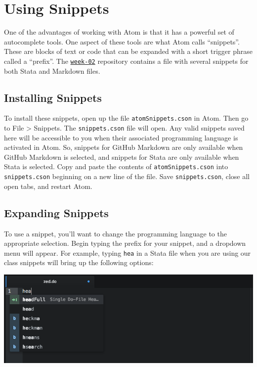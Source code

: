 \documentclass[]{book}
\begin{document}
\section{Using Snippets}\label{using-snippets}

One of the advantages of working with Atom is that it has a powerful set
of autocomplete tools. One aspect of these tools are what Atom calls
``snippets''. These are blocks of text or code that can be expanded with
a short trigger phrase called a ``prefix''. The
\href{https://github.com/slu-soc5650/week-02}{\texttt{week-02}}
repository contains a file with several snippets for both Stata and
Markdown files.

\subsection{Installing Snippets}\label{installing-snippets}

To install these snippets, open up the file \texttt{atomSnippets.cson}
in Atom. Then go to File \textgreater{} Snippets. The
\texttt{snippets.cson} file will open. Any valid snippets saved here
will be accessible to you when their associated programming language is
activated in Atom. So, snippets for GitHub Markdown are only available
when GitHub Markdown is selected, and snippets for Stata are only
available when Stata is selected. Copy and paste the contents of
\texttt{atomSnippets.cson} into \texttt{snippets.cson} beginning on a
new line of the file. Save \texttt{snippets.cson}, close all open tabs,
and restart Atom.

\subsection{Expanding Snippets}\label{expanding-snippets}

To use a snippet, you'll want to change the programming language to the
appropriate selection. Begin typing the prefix for your snippet, and a
dropdown menu will appear. For example, typing \texttt{hea} in a Stata
file when you are using our class snippets will bring up the following
options:

\includegraphics[width=1\linewidth]{images/atomSnippet}
\end{document}
